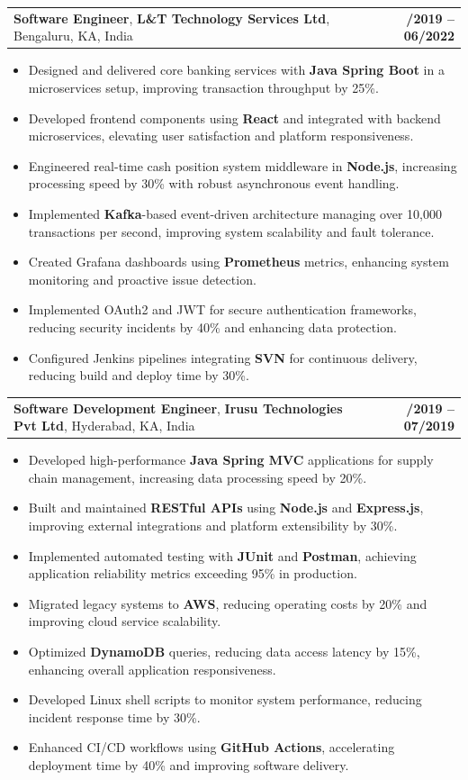 \documentclass[letterpaper,11pt]{article}
\makeatletter
\newcommand{\resumeItem}[1]{
  \item\footnotesize{
    {#1 \vspace{-2pt}}
  }
}
\newcommand{\resumeSubheading}[4]{
  \vspace{-2pt}\item
    \begin{tabular*}{1.0\textwidth}[t]{l@{\extracolsep{\fill}}r}
      \textbf{\fontsize{10pt}{14pt}\selectfont #3}, \textbf{\fontsize{10pt}{14pt}\selectfont #1}, \fontsize{10pt}{14pt}\selectfont #4 & \textbf{\fontsize{10pt}{14pt}\selectfont #2} \\
    \end{tabular*}\vspace{-7pt}
}
\newcommand{\resumeItemListStart}{\begin{itemize}[leftmargin=*]}
\newcommand{\resumeItemListEnd}{\end{itemize}\vspace{-5pt}}
\makeatother
\begin{document}
    \resumeSubheading
        {L\&T Technology Services Ltd}{08/2019 -- 06/2022}
        {Software Engineer}{Bengaluru, KA, India}
      \resumeItemListStart
        \resumeItem{Designed and delivered core banking services with \textbf{Java Spring Boot} in a microservices setup, improving transaction throughput by 25\%.}
        \resumeItem{Developed frontend components using \textbf{React} and integrated with backend microservices, elevating user satisfaction and platform responsiveness.}
        \resumeItem{Engineered real-time cash position system middleware in \textbf{Node.js}, increasing processing speed by 30\% with robust asynchronous event handling.}
        \resumeItem{Implemented \textbf{Kafka}-based event-driven architecture managing over 10,000 transactions per second, improving system scalability and fault tolerance.}
        \resumeItem{Created Grafana dashboards using \textbf{Prometheus} metrics, enhancing system monitoring and proactive issue detection.}
        \resumeItem{Implemented OAuth2 and JWT for secure authentication frameworks, reducing security incidents by 40\% and enhancing data protection.}
        \resumeItem{Configured Jenkins pipelines integrating \textbf{SVN} for continuous delivery, reducing build and deploy time by 30\%.}
      \resumeItemListEnd

    \resumeSubheading
        {Irusu Technologies Pvt Ltd}{01/2019 -- 07/2019}
        {Software Development Engineer}{Hyderabad, KA, India}
      \resumeItemListStart
        \resumeItem{Developed high-performance \textbf{Java Spring MVC} applications for supply chain management, increasing data processing speed by 20\%.}
        \resumeItem{Built and maintained \textbf{RESTful APIs} using \textbf{Node.js} and \textbf{Express.js}, improving external integrations and platform extensibility by 30\%.}
        \resumeItem{Implemented automated testing with \textbf{JUnit} and \textbf{Postman}, achieving application reliability metrics exceeding 95\% in production.}
        \resumeItem{Migrated legacy systems to \textbf{AWS}, reducing operating costs by 20\% and improving cloud service scalability.}
        \resumeItem{Optimized \textbf{DynamoDB} queries, reducing data access latency by 15\%, enhancing overall application responsiveness.}
        \resumeItem{Developed Linux shell scripts to monitor system performance, reducing incident response time by 30\%.}
        \resumeItem{Enhanced CI/CD workflows using \textbf{GitHub Actions}, accelerating deployment time by 40\% and improving software delivery.}
      \resumeItemListEnd
\end{document}
